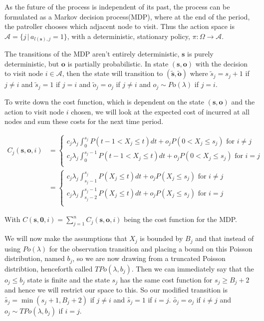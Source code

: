 \documentclass[a4paper,10pt]{article}
\theoremstyle{definition}
\theoremstyle{definition}
\theoremstyle{remark}
\theoremstyle{definition}
\begin{document}
As the future of the process is independent of its past, the process can be formulated as a Markov decision process(MDP), where at the end of the period, the patroller chooses which adjacent node to visit. Thus the action space is $\mathcal{A}=\{ j \, | \, a_{l(\bm{s}),j}=1 \}$, with a deterministic, stationary policy, $\pi: \Omega \rightarrow \mathcal{A}$.

The transitions of the MDP aren't entirely deterministic, $\bm{s}$ is purely deterministic, but $\bm{o}$ is partially probabilistic. In state $(\bm{s},\bm{o})$ with the decision to visit node $i \in \mathcal{A}$, then the state will transition to $(\widetilde{\bm{s}},\widetilde{\bm{o}})$ where $\widetilde{s}_{j}=s_{j}+1$ if $j \neq i$ and $\widetilde{s}_{j}=1$ if $j=i$ and $\widetilde{o}_{j}=o_{j}$ if $j \neq i$ and $o_{j} \sim Po(\lambda)$ if $j=i$.

To write down the cost function, which is dependent on the state $(\bm{s},\bm{o})$ and the action to visit node $i$ chosen, we will look at the expected cost of incurred at all nodes and sum these costs for the next time period.

\begin{align}
C_{j}(\bm{s},\bm{o},i)&= \begin{cases}
c_{j} \lambda_{j} \int_{0}^{s_{j}} P(t-1<X_{j} \leq t) dt +o_{j}P(0<X_{j} \leq s_{j})  \text{ for } i \neq j \\
c_{j} \lambda_{j} \int_{0}^{s_{j}-1} P(t-1<X_{j} \leq t) dt +o_{j}P(0<X_{j} \leq s_{j})  \text{ for } i=j \\
\end{cases}
 \nonumber \\
&= \begin{cases}
c_{j} \lambda_{j} \int_{s_{j}-1}^{s_{j}} P(X_{j} \leq t) dt +o_{j}P(X_{j} \leq s_{j}) \text{ for } i \neq j \\
c_{j} \lambda_{j} \int_{s_{j}-2}^{s_{j}-1} P(X_{j} \leq t) dt +o_{j}P(X_{j} \leq s_{j})   \text{ for } i=j \\
\end{cases} 
\end{align}
   
With $C(\bm{s},\bm{0},i)=\sum\limits_{j=1}^{n} C_{j}(\bm{s},\bm{o},i)$ being the cost function for the MDP.

We will now make the assumptions that $X_{j}$ is bounded by $B_{j}$ and that instead of using $Po(\lambda)$ for the observation transition and placing a bound on this Poisson distribution, named $b_{j}$, so we are now drawing from a truncated Poisson distribtion, henceforth called $TPo(\lambda,b_{j})$. Then we can immediately say that the $o_{j} \leq b_{j}$ state is finite and the state $s_{j}$ has the same cost function for $s_{j} \geq B_{j}+2$ and hence we will restrict our space to this. So our modified transition is $\widetilde{s_{j}}=\min(s_{j}+1,B_{j}+2)$ if $j \neq i$ and $\widetilde{s_{j}}=1$ if $i=j$. $\widetilde{o_{j}}=o_{j}$ if $i \neq j$ and $o_{j} \sim TPo(\lambda,b_{j})$ if $i=j$.
\end{document}
